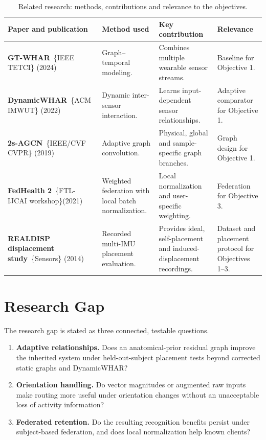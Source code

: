 \documentclass[10pt,a4paper,oneside,openany]{report}
\begin{document}
\begin{table}[htbp]
\centering
\caption{Related research: methods, contributions and relevance to the objectives.}
\label{tab:research}
\begingroup
{}
\setlength{\tabcolsep}{4pt}
\renewcommand{\arraystretch}{1.3}
\begin{tabularx}{\textwidth}{|P{0.32\textwidth}|P{0.20\textwidth}|P{0.22\textwidth}|Y|}
\hline
\textbf{Paper and publication} & \textbf{Method used} & \textbf{Key contribution} & \textbf{Relevance} \\
\hline
\textbf{GT-WHAR}~\cite{gtwhar}\newline \{IEEE TETCI\} (2024) & Graph--temporal modeling. & Combines multiple wearable sensor streams. & Baseline for Objective 1. \\
\hline
\textbf{DynamicWHAR}~\cite{dynamicwhar}\newline \{ACM IMWUT\} (2022) & Dynamic inter-sensor interaction. & Learns input-dependent sensor relationships. & Adaptive comparator for Objective 1. \\
\hline
\textbf{2s-AGCN}~\cite{agcn}\newline \{IEEE/CVF CVPR\} (2019) & Adaptive graph convolution. & Physical, global and sample-specific graph branches. & Graph design for Objective 1. \\
\hline
\textbf{FedHealth 2}~\cite{fedhealth}\newline \{FTL-IJCAI workshop\}\newline (2021) & Weighted federation with local batch normalization. & Local normalization and user-specific weighting. & Federation for Objective 3. \\
\hline
\textbf{REALDISP displacement study}~\cite{banos}\newline \{Sensors\} (2014) & Recorded multi-IMU placement evaluation. & Provides ideal, self-placement and induced-displacement recordings. & Dataset and placement protocol for Objectives 1--3. \\
\hline
\end{tabularx}
\endgroup
\end{table}

\section{Research Gap}

The research gap is stated as three connected, testable questions.
\begin{enumerate}
\item \textbf{Adaptive relationships.} Does an anatomical-prior residual graph improve the inherited system under held-out-subject placement tests beyond corrected static graphs and DynamicWHAR?
\item \textbf{Orientation handling.} Do vector magnitudes or augmented raw inputs make routing more useful under orientation changes without an unacceptable loss of activity information?
\item \textbf{Federated retention.} Do the resulting recognition benefits persist under subject-based federation, and does local normalization help known clients?
\end{enumerate}
\end{document}
